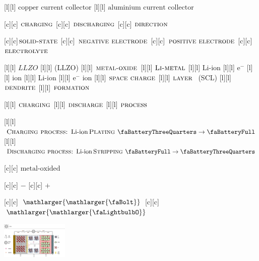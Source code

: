 [l][l]  {\footnotesize $\text{copper current collector}$}
[l][l] {\footnotesize $\text{aluminium current collector}$}

[c][c]  {\scriptsize $\textsc{charging}$}
[c][c] {\scriptsize $\textsc{discharging}$}
[c][c] {\scriptsize $\textsc{direction}$}

[c][c]{\scriptsize $\textsc{solid-state}$}
[c][c] {\scriptsize $\textsc{negative electrode}$}
[c][c] {\scriptsize $\textsc{positive electrode}$}
[c][c] {\scriptsize $\textsc{electrolyte}$}

[l][l]  {\tiny $LLZO$}
[l][l] {\tiny (LLZO)}
[l][l] {\tiny $\textsc{metal-oxide}$}
[l][l]  {\tiny $\textsc{Li-metal}$}
[l][l] {\tiny Li-ion}
[l][l] {\tiny $\text{e}^{-}$}
[l][l] {\tiny $\text{ion}$}
[l][l] {\tiny Li-ion}
[l][l] {\tiny $\text{e}^{-}$ ion}
[l][l]  {\tiny $\textsc{space charge}$}
[l][l]  {\tiny $\textsc{layer }$ (SCL)}
[l][l]   {\tiny $\textsc{dendrite}$}
[l][l]  {\tiny $\textsc{formation}$}

[l][l]  {\tiny $\textsc{charging}$}
[l][l] {\tiny $\textsc{discharge}$}
[l][l]  {\tiny $\textsc{process}$}

[l][l] {$\textsc{Charging process: }\text{Li-ion}\,\textsc{Plating }
		\text{\faBatteryThreeQuarters} \rightarrow \text{\faBatteryFull}$}
[l][l] {\scriptsize $\textsc{Discharging process: }\text{Li-ion}\,\textsc{Stripping }
		\text{\faBatteryFull} \rightarrow \text{\faBatteryThreeQuarters}$}

[c][c] {$\text{metal-oxided}$}

[c][c] {$-$}
[c][c] {$+$}

[c][c] {$\mathlarger{\mathlarger{\text{\faBolt}}}$}
[c][c] {$\mathlarger{\mathlarger{\text{\faLightbulbO}}}$}

\includegraphics[width=0.24\textwidth]{batt3dswell_scaled_2ways_discharging_color.eps}